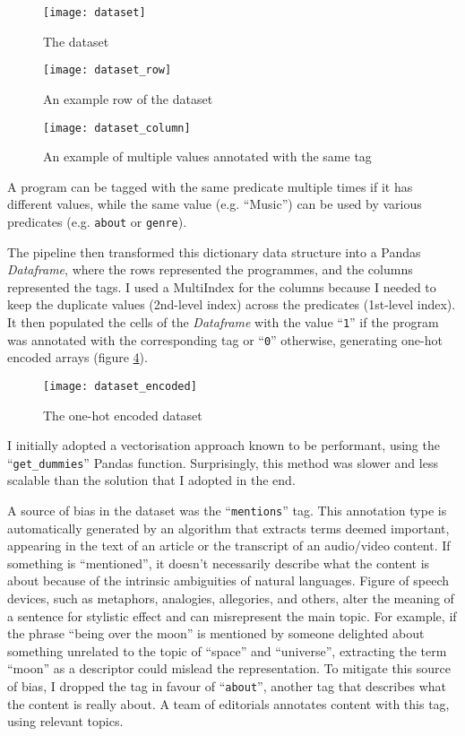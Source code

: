 \begin{figure}[h]
  \centering
  \texttt{[image: dataset]}
  \caption{The dataset}
  \label{fig:dataset}
\end{figure}

\begin{figure}[h]
  \centering
  \texttt{[image: dataset\_row]}
  \caption{An example row of the dataset}
  \label{fig:dataset_row}
\end{figure}

\begin{figure}[h]
  \centering
  \texttt{[image: dataset\_column]}
  \caption{An example of multiple values annotated with the same tag}
  \label{fig:dataset_column}
\end{figure}

A program can be tagged with the same predicate multiple times if it has different values,
while the same value (e.g. ``Music'') can be used by various predicates (e.g. \verb|about| or \verb|genre|).

The pipeline then transformed this dictionary data structure into a Pandas \textit{Dataframe},
where the rows represented the programmes, and the columns represented the tags.
I used a MultiIndex \cite{Pandas:MultiIndex} for the columns because I needed to keep the duplicate values (2nd-level index) across the predicates
(1st-level index).
It then populated the cells of the \textit{Dataframe} with the value ``\verb|1|''
if the program was annotated with the corresponding tag or ``\verb|0|'' otherwise, generating one-hot encoded arrays (figure \ref{fig:dataset_encoded}).

\begin{figure}[h]
  \centering
  \texttt{[image: dataset\_encoded]}
  \caption{The one-hot encoded dataset}
  \label{fig:dataset_encoded}
\end{figure}

I initially adopted a vectorisation approach known to be performant, using the ``\verb|get_dummies|'' Pandas function.
Surprisingly, this method was slower and less scalable than the solution that I adopted in the end.

A source of bias in the dataset was the ``\verb|mentions|'' tag. This annotation type is automatically generated by an algorithm that extracts
terms deemed important, appearing in the text of an article or the transcript of an audio/video content.
If something is ``mentioned'', it doesn't necessarily describe what the content is about because of the intrinsic ambiguities of natural languages.
Figure of speech devices, such as metaphors, analogies, allegories, and others, alter the meaning of a sentence for stylistic effect and can misrepresent the main topic.
For example, if the phrase ``being over the moon'' is mentioned
by someone delighted about something unrelated to the topic of ``space'' and ``universe'',
extracting the term ``moon'' as a descriptor could mislead the representation.
To mitigate this source of bias, I dropped the tag in favour of ``\verb|about|'', another tag that describes what the content is really about.
A team of editorials annotates content with this tag, using relevant topics.

